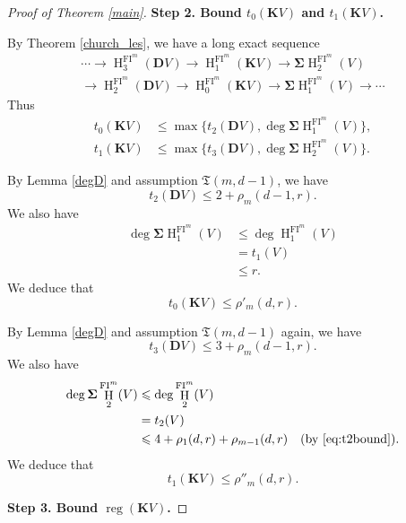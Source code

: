 \documentclass{amsart}
\numberwithin{equation}{section}
\DeclareMathOperator{\reg}{reg}
\DeclareMathOperator{\HH}{H}
\newcommand{\FI}{{\mathrm{FI}}}
\begin{document}
\begin{proof}[Proof of Theorem \ref{main}]
   \medskip 

   {\bf Step 2. Bound $t_0(\mathbf{K}V)$ and $t_1(\mathbf{K}V)$.}

   By Theorem \ref{church_les}, we have a long exact sequence 
   \begin{multline*} 
      \cdots \to \HH^{\FI^m}_3(\mathbf{D}V) \to  \HH^{\FI^m}_1(\mathbf{K}V) \to \mathbf{\Sigma}\HH^{\FI^m}_2(V) \\ 
      \to \HH^{\FI^m}_2(\mathbf{D}V) \to  \HH^{\FI^m}_0(\mathbf{K}V) \to \mathbf{\Sigma}\HH^{\FI^m}_1(V) \to \cdots
   \end{multline*}
   Thus 
   \begin{align*}
      t_0(\mathbf{K}V) &\leqslant \max\{ t_2(\mathbf{D}V) , \deg \mathbf{\Sigma}\HH^{\FI^m}_1(V) \}, \\
      t_1(\mathbf{K}V) &\leqslant \max\{ t_3(\mathbf{D}V) , \deg \mathbf{\Sigma}\HH^{\FI^m}_2(V) \}.
   \end{align*}

   By Lemma \ref{degD} and assumption $\mathfrak{T}(m, d-1)$, we have 
   \[ t_2(\mathbf{D}V) \leqslant 2+\rho_m(d-1, r). \]
   We also have 
   \begin{align*}
      \deg \mathbf{\Sigma}\HH^{\FI^m}_1(V) &\leqslant \deg \HH^{\FI^m}_1(V) \\ 
      &= t_1(V) \\ 
      &\leqslant r.
   \end{align*}
   We deduce that 
   \begin{equation} \label{eq:bound t0}
      t_0(\mathbf{K}V) \leqslant \rho'_m(d,r). 
   \end{equation}

   By Lemma \ref{degD} and assumption $\mathfrak{T}(m, d-1)$ again, we have 
   \[ t_3(\mathbf{D}V) \leqslant 3+\rho_m(d-1, r). \]
   We also have 
   \begin{align*}
      \deg \mathbf{\Sigma}\HH^{\FI^m}_2(V) &\leqslant \deg \HH^{\FI^m}_2(V) & \\
      &= t_2(V) & \\
      &\leqslant 4+ \rho_1(d,r) + \rho_{m-1}(d,r) & \mbox{(by \eqref{eq:t2bound})}.
   \end{align*}
   We deduce that 
   \begin{equation} \label{eq:bound t1}
      t_1(\mathbf{K}V) \leqslant \rho''_m(d,r).
   \end{equation}

   \medskip 

   {\bf Step 3. Bound $\reg(\mathbf{K}V)$.}


\end{proof}
\end{document}
